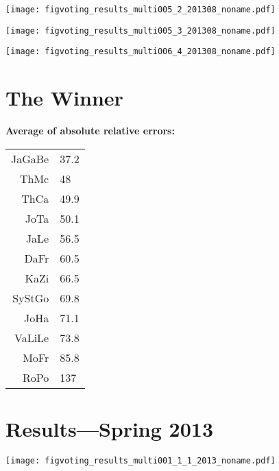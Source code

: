\begin{frame}[plain]
\begin{frame}[plain]
\begin{frame}[plain]
\begin{frame}[plain]
\begin{frame}[plain]
\begin{frame}[plain]
\begin{frame}[plain]
\begin{frame}[plain]
  

  \texttt{[image: figvoting\_results\_multi005\_2\_201308\_noname.pdf]}


\begin{frame}[plain]
  

  \texttt{[image: figvoting\_results\_multi005\_3\_201308\_noname.pdf]}


\begin{frame}[plain]
  

  \texttt{[image: figvoting\_results\_multi006\_4\_201308\_noname.pdf]}


\section{The Winner}

  \small
  \textbf{Average of absolute relative errors:}

  \begin{tabular}{rl}
    JaGaBe & 37.2 \\ 
    ThMc &   48 \\ 
    ThCa & 49.9 \\ 
    JoTa & 50.1 \\ 
    JaLe & 56.5 \\ 
    DaFr & 60.5 \\ 
    KaZi & 66.5 \\ 
    SyStGo & 69.8 \\ 
    JoHa & 71.1 \\ 
    VaLiLe & 73.8 \\ 
    MoFr & 85.8 \\ 
    RoPo &  137 \\ 
  \end{tabular}




  

\section{Results---Spring 2013}


\begin{frame}[plain]
  

  \texttt{[image: figvoting\_results\_multi001\_1\_1\_2013\_noname.pdf]}\\



\end{frame}
\end{frame}
\end{frame}
\end{frame}
\end{frame}
\end{frame}
\end{frame}
\end{frame}
\end{frame}
\end{frame}
\end{frame}
